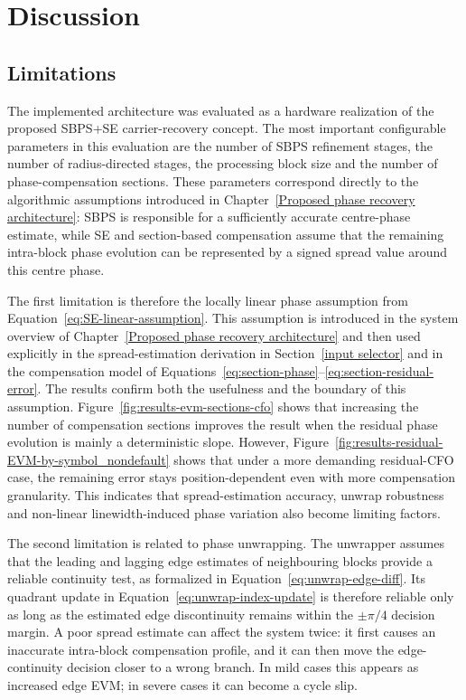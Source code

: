 \chapter{Discussion}\label{Discussion}

\section{Limitations}

The implemented architecture was evaluated as a hardware realization of the proposed \ac{SBPS}+\ac{SE} carrier-recovery concept. The most important configurable parameters in this evaluation are the number of \ac{SBPS} refinement stages, the number of radius-directed stages, the processing block size and the number of phase-compensation sections. These parameters correspond directly to the algorithmic assumptions introduced in Chapter~\ref{Proposed phase recovery architecture}: \ac{SBPS} is responsible for a sufficiently accurate centre-phase estimate, while \ac{SE} and section-based compensation assume that the remaining intra-block phase evolution can be represented by a signed spread value around this centre phase.

The first limitation is therefore the locally linear phase assumption from Equation~\ref{eq:SE-linear-assumption}. This assumption is introduced in the system overview of Chapter~\ref{Proposed phase recovery architecture} and then used explicitly in the spread-estimation derivation in Section~\ref{input selector} and in the compensation model of Equations~\ref{eq:section-phase}--\ref{eq:section-residual-error}. The results confirm both the usefulness and the boundary of this assumption. Figure~\ref{fig:results-evm-sections-cfo} shows that increasing the number of compensation sections improves the result when the residual phase evolution is mainly a deterministic slope. However, Figure~\ref{fig:results-residual-EVM-by-symbol_nondefault} shows that under a more demanding residual-\ac{CFO} case, the remaining error stays position-dependent even with more compensation granularity. This indicates that spread-estimation accuracy, unwrap robustness and non-linear linewidth-induced phase variation also become limiting factors.

The second limitation is related to phase unwrapping. The unwrapper assumes that the leading and lagging edge estimates of neighbouring blocks provide a reliable continuity test, as formalized in Equation~\ref{eq:unwrap-edge-diff}. Its quadrant update in Equation~\ref{eq:unwrap-index-update} is therefore reliable only as long as the estimated edge discontinuity remains within the \(\pm\pi/4\) decision margin. A poor spread estimate can affect the system twice: it first causes an inaccurate intra-block compensation profile, and it can then move the edge-continuity decision closer to a wrong branch. In mild cases this appears as increased edge \ac{EVM}; in severe cases it can become a cycle slip.

